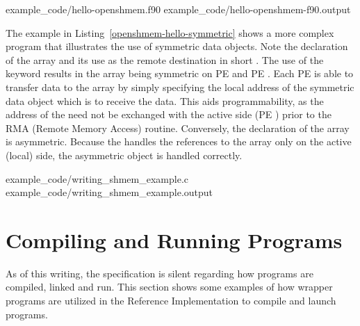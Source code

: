 \begin{minipage}{\linewidth}
\vspace{0.1in}
                {example_code/hello-openshmem.f90}
                {example_code/hello-openshmem-f90.output}
\vspace{0.1in}
\end{minipage}

The example in Listing~\ref{openshmem-hello-symmetric} shows a more complex \openshmem program that illustrates
the use of symmetric data objects.  Note the declaration of the   array and its use as the remote destination in \openshmem short
\PUT.  The use of the  keyword results in the  array being
symmetric on \ac{PE}  and \ac{PE} .  Each \ac{PE} is able to
transfer data to the \dest{} array by simply specifying the local address of the
symmetric data object which is to receive the data.  This aids programmability,
as the address of the \dest{} need not be exchanged with the active side
(\ac{PE} ) prior to the RMA (Remote Memory Access) routine.
Conversely, the declaration of the  array is asymmetric.
Because the \PUT{} handles the references to the  array only on the
active (local) side, the asymmetric \source{} object is handled correctly.

\begin{minipage}{\linewidth}
\vspace{0.1in}
                {example_code/writing_shmem_example.c}
                {example_code/writing_shmem_example.output}
\vspace{0.1in}
\end{minipage}




\chapter{Compiling and Running Programs}\label{sec:compiling}
As of this writing, the \openshmem specification is silent regarding how
\openshmem programs are compiled, linked and run. This section shows some
examples of how wrapper programs are utilized in the \openshmem Reference
Implementation to compile and launch programs.

